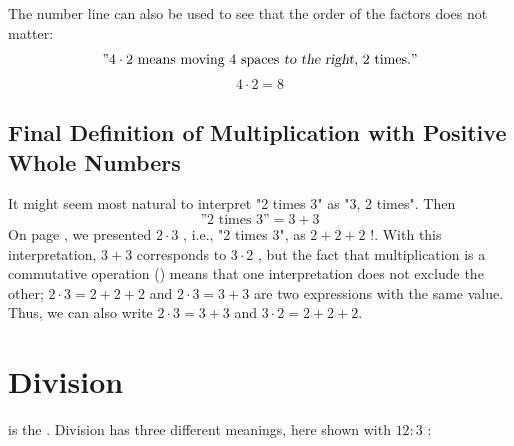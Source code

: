 	The number line can also be used to see that the order of the factors does not matter:
	\[\text{''} 4\cdot 2 \text{ means moving 4 spaces \textsl{to the right}, 2 times.}\text{''} \]
	\[ 4\cdot2=8 \]
	
	\subsection*{Final Definition of Multiplication with Positive Whole Numbers}
	It might seem most natural to interpret "2 times 3" as "3, 2 times". Then
	\[ \text{''2 times 3''}=3+3 \]
	On page \pageref{gangmengd},
	we presented
	$ 2\cdot3 $
	, i.e., "2 times 3", as
	$ {2+2+2} $
	\!!. With this interpretation,
	$ {3+3} $
	corresponds to
	$ {3\cdot2} $
	, but the fact that multiplication is a commutative operation () means that one interpretation does not exclude the other;
	$ {2\cdot3 =2+2+2} $
	and
	$ {2\cdot3=3+3} $
	are two expressions with the same value. Thus, we can also write $2\cdot3=3+3$ and $3\cdot2=2+2+2$.\regv
	
	
	
	
	\section{Division \label{Divisjon}} 
	\sym{:}
	is the .
	Division has three different meanings, here shown with
	$ 12:3 $
	:\regv
	
	 \regv
	
